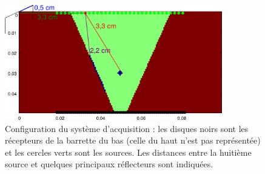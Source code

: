 \documentclass[a4paper,11pt]{report} %
\begin{document}
\begin{figure}[!h]
	\centering
	\includegraphics[height=5cm]{img/multi_ref_trans/config.png}
	\caption{Configuration du système d'acquisition  : les disques noirs sont les récepteurs de la barrette du bas (celle du haut n'est pas représentée) et les cercles verts sont les sources. Les distances entre la huitième source et quelques principaux réflecteurs sont indiquées.\label{config}}
\end{figure}
\end{document}
